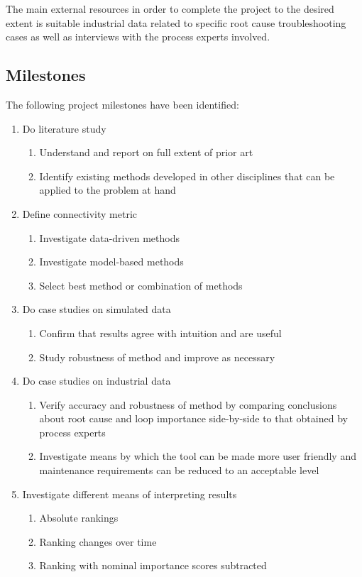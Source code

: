 \documentclass{article}
\begin{document}
The main external resources in order to complete the project to the desired extent is suitable industrial data related to specific root cause troubleshooting cases as well as interviews with the process experts involved.

\subsection{Milestones}

The following project milestones have been identified:

\begin{enumerate}
  \item Do literature study
  \begin{enumerate}
    \item Understand and report on full extent of prior art
    \item Identify existing methods developed in other disciplines that can be applied to the problem at hand
  \end{enumerate}
  \item Define connectivity metric
  \begin{enumerate}
    \item Investigate data-driven methods
    \item Investigate model-based methods
    \item Select best method or combination of methods
  \end{enumerate}
  \item Do case studies on simulated data
  \begin{enumerate}
    \item Confirm that results agree with intuition and are useful
    \item Study robustness of method and improve as necessary
  \end{enumerate}
  \item Do case studies on industrial data
  \begin{enumerate}
    \item Verify accuracy and robustness of method by comparing conclusions about root cause and loop importance side-by-side to that obtained by process experts
    \item Investigate means by which the tool can be made more user friendly and maintenance requirements can be reduced to an acceptable level
  \end{enumerate}
  \item Investigate different means of interpreting results
  \begin{enumerate}
    \item Absolute rankings
    \item Ranking changes over time
    \item Ranking with nominal importance scores subtracted
  \end{enumerate}
\end{enumerate}
\end{document}
